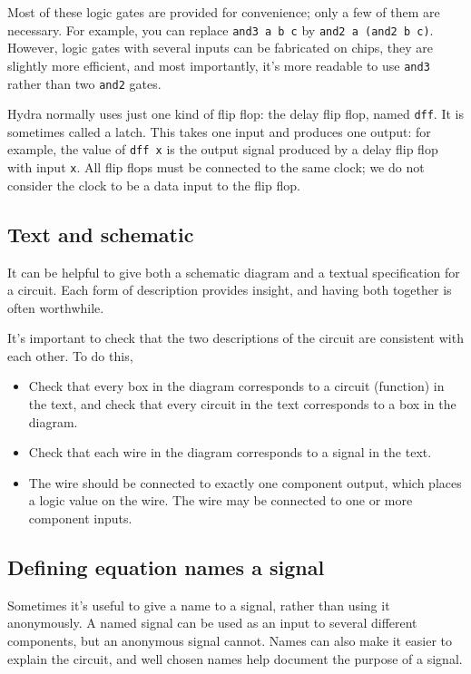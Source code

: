 \documentclass[11pt]{article}
\begin{document}
Most of these logic gates are provided for convenience; only a few of
them are necessary.  For example, you can replace \texttt{and3 a b c} by
\texttt{and2 a (and2 b c)}.  However, logic gates with several inputs can be
fabricated on chips, they are slightly more efficient, and most
importantly, it's more readable to use \texttt{and3} rather than two \texttt{and2}
gates.

Hydra normally uses just one kind of flip flop: the delay flip flop,
named \texttt{dff}.  It is sometimes called a latch.  This takes one input
and produces one output: for example, the value of \texttt{dff x} is the
output signal produced by a delay flip flop with input \texttt{x}.  All flip
flops must be connected to the same clock; we do not consider the
clock to be a data input to the flip flop.

\subsection{Text and schematic}
\label{sec:org0647224}

It can be helpful to give both a schematic diagram and a textual
specification for a circuit.  Each form of description provides
insight, and having both together is often worthwhile.

It's important to check that the two descriptions of the circuit are
consistent with each other.  To do this,
\begin{itemize}
\item Check that every box in the diagram corresponds to a circuit
(function) in the text, and check that every circuit in the text
corresponds to a box in the diagram.
\item Check that each wire in the diagram corresponds to a signal in the
text.
\item The wire should be connected to exactly one component output, which
places a logic value on the wire.  The wire may be connected to one
or more component inputs.
\end{itemize}

\subsection{Defining equation names a signal}
\label{sec:org71218c9}

Sometimes it's useful to give a name to a signal, rather than using it
anonymously.  A named signal can be used as an input to several
different components, but an anonymous signal cannot.  Names can also
make it easier to explain the circuit, and well chosen names help
document the purpose of a signal.
\end{document}
